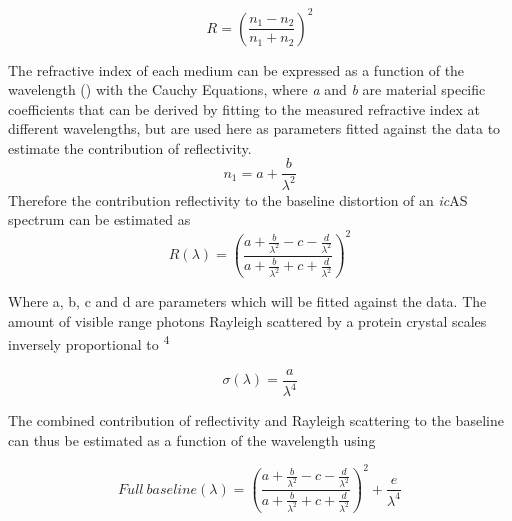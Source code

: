 \begin{equation}\label{eq:reflection}
R = \left(\frac{n_1 - n_2}{n_1 + n_2}\right)^2
\end{equation}


The refractive index of each medium can be expressed as a function of the wavelength (\textlambda) with the Cauchy Equations, where \textit{a} and \textit{b} are material specific coefficients that can be derived by fitting to the measured refractive index at different wavelengths, but are used here as parameters fitted against the data to estimate the contribution of reflectivity.
\begin{equation}\label{eq:refraction_index}
n_1 =a + \frac{b}{{\lambda^2}}
\end{equation}
Therefore the contribution reflectivity to the baseline distortion of an \textit{ic}AS spectrum can be estimated as 
\begin{equation}\label{eq:reflection_f_wavelength}
R(\lambda) = \left(\frac{a+\frac{b}{\lambda^2} - c-\frac{d}{\lambda^2}}{ a+\frac{b}{\lambda^2}  + c+\frac{d}{\lambda^2}}\right)^2
\end{equation}





Where a, b, c and d are parameters which will be fitted against the data.
The amount of visible range photons Rayleigh scattered by a protein crystal scales inversely proportional to \textlambda \textsuperscript{4} \parencite{calvertGlossaryAtmosphericChemistry1990}


\begin{equation}\label{eq:rayleigh}
\sigma(\lambda) = \frac{a}{{\lambda^4}}
\end{equation}


The combined contribution of reflectivity and Rayleigh scattering to the baseline can thus be estimated as a function of the wavelength using  


\begin{equation}\label{eq:modeling_background}
    Full\ baseline(\lambda) = \left(\frac{a+\frac{b}{\lambda^2} - c-\frac{d}{\lambda^2}}{ a+\frac{b}{\lambda^2}  + c+\frac{d}{\lambda^2}}\right)^2 + \frac{e}{{\lambda^4}}
\end{equation}


